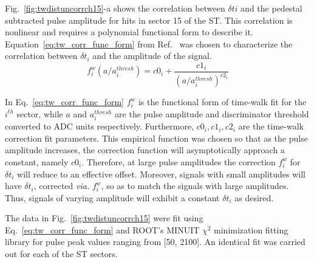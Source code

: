 Fig.~\ref{fig:twdistuncorrch15}-a shows the correlation between $\delta t{i}$ and the pedestal subtracted pulse amplitude for hits in sector 15 of the ST.  This correlation is nonlinear and requires a polynomial functional form to describe it. Equation~\ref{eq:tw_corr_func_form} from Ref.~\cite{esmith_bcal} was chosen to characterize the correlation between $\delta t_{i}$ and the amplitude of the signal. 
	\begin{equation} \label{eq:tw_corr_func_form}
		f^{w}_{i}\left(a/a^{thresh}_{i}\right) = c0_{i} + \frac{c1_{i}}{(a/a^{thresh}_{i})^{c2_{i}}}
	\end{equation}

In Eq.~\ref{eq:tw_corr_func_form} $f^{w}_{i}$ is the functional form of time-walk fit for the $i^{th}$ sector, while $a$ and $a^{thresh}_{i}$ are the pulse amplitude and discriminator threshold converted to ADC units respectively.  Furthermore, $c0_{i}, c1_{i}, c2_{i}$ are the time-walk correction fit parameters.  This empirical function was chosen so that as the pulse amplitude increases, the correction function will asymptotically approach a constant, namely $c0_{i}$.  Therefore, at large pulse amplitudes the correction $f^{w}_{i}$ for $\delta t_{i}$ will reduce to an effective offset.  Moreover, signals with small amplitudes will have $\delta t_{i}$, corrected \textit{via.} $f^{w}_{i}$, so as to match the signals with large amplitudes.  Thus, signals of varying amplitude will exhibit a constant $\delta t_{i}$ as desired.

The data in Fig.~\ref{fig:twdistuncorrch15} were fit using Eq.~\ref{eq:tw_corr_func_form} and ROOT's MINUIT $\chi^{2}$ minimization fitting library \cite{root_minuit} for pulse peak values ranging from [50, 2100].  An identical fit was carried out for each of the ST sectors. 


